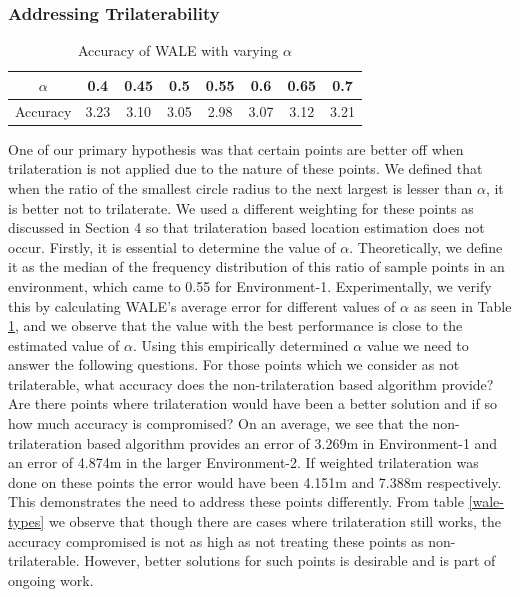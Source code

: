 \documentclass[twocolumn]{svjour3}
\begin{document}
\subsubsection{\textbf{Addressing Trilaterability}}
\begin{table}[t]
\centering
\begin{tabular}{ |c|c|c|c|c|c|c|c| } 
\hline
$\alpha$ & 0.4  & 0.45 & 0.5 & 0.55 & 0.6 & 0.65 & 0.7 \\
\hline
Accuracy & 3.23 & 3.10 & 3.05 & 2.98 & 3.07 & 3.12 & 3.21 \\
\hline
\end{tabular}
\vspace{0.2in}
\caption{Accuracy of WALE with varying $\alpha$}
\label{alpha-types}
\end{table}
One of our primary hypothesis was that certain points are better off when trilateration is not applied due to the nature of these points. We defined that when the ratio of the smallest circle radius to the next largest is lesser than $\alpha$, it is better not to trilaterate. We used a different weighting for these points as discussed in Section 4 so that trilateration based location estimation does not occur. Firstly, it is essential to determine the value of $\alpha$. Theoretically, we define it as the median of the frequency distribution of this ratio of sample points in an environment, which came to 0.55 for Environment-1. Experimentally, we verify this by calculating WALE's average error for different values of $\alpha$ as seen in Table \ref{alpha-types}, and we observe that the value with the best performance is close to the estimated value of $\alpha$. 
Using this empirically determined $\alpha$ value we need to answer the following questions. For those points which we consider as not trilaterable, what accuracy does the non-trilateration based algorithm provide? Are there points where trilateration would have been a better solution and if so how much accuracy is compromised? On an average, we see that the non-trilateration based algorithm provides an error of 3.269m in Environment-1 and an error of 4.874m in the larger Environment-2. If weighted trilateration was done on these points the error would have been 4.151m and 7.388m respectively. This demonstrates the need to address these points differently. From table \ref{wale-types} we observe that though there are cases where trilateration still works, the accuracy compromised is not as high as not treating these points as non-trilaterable. However, better solutions for such points is desirable and is part of ongoing work.
\end{document}
